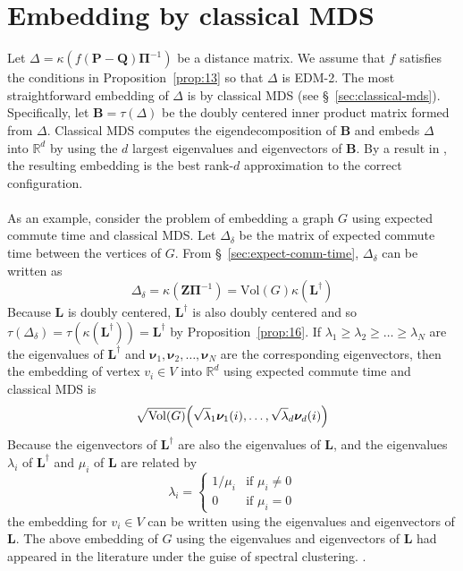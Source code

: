 \section{Embedding by classical MDS}
\label{sec:embedd-class-mds}
Let $\Delta = \kappa(f(\mathbf{P} - \mathbf{Q})\bm{\Pi}^{-1})$ be a
distance matrix. We assume that $f$ satisfies the conditions in
Proposition~\ref{prop:13} so that $\Delta$ is EDM-2. The most
straightforward embedding of $\Delta$ is by classical MDS (see
\S~\ref{sec:classical-mds}). Specifically, let $\mathbf{B} =
\tau(\Delta)$ be the doubly centered inner product matrix formed from
$\Delta$. Classical MDS computes the eigendecomposition of
$\mathbf{B}$ and embeds $\Delta$ into $\mathbb{R}^{d}$ by using the
$d$ largest eigenvalues and eigenvectors of $\mathbf{B}$. By a result
in \cite{eckart36:_approx}, the resulting embedding is the
best rank-$d$ approximation to the correct configuration. \\ \\
\noindent
As an example, consider the problem of embedding a graph $G$ using
expected commute time and classical MDS. Let $\Delta_\delta$ be the
matrix of expected commute time between the vertices of $G$. From
\S~\ref{sec:expect-comm-time}, $\Delta_{\delta}$ can be written as
\begin{equation*}
  \Delta_{\delta} = \kappa(\mathbf{Z}\bm{\Pi}^{-1}) = \mathrm{Vol}(G)
  \kappa(\mathbf{L}^{\dagger})
\end{equation*}
Because $\mathbf{L}$ is doubly centered, $\mathbf{L}^{\dagger}$ is
also doubly centered and so $\tau(\Delta_{\delta}) =
\tau(\kappa(\mathbf{L}^{\dagger})) = \mathbf{L}^{\dagger}$ by
Proposition~\ref{prop:16}. If $\lambda_1 \geq \lambda_2 \geq \dots \geq
\lambda_N$ are the eigenvalues of $\mathbf{L}^{\dagger}$ and
$\bm{\nu}_1, \bm{\nu}_2, \dots, \bm{\nu}_N$ are the corresponding
eigenvectors, then the embedding of vertex $v_i \in V$ into
$\mathbb{R}^{d}$ using expected commute time and classical MDS is
\begin{equation}
  \label{eq:33}
  \sqrt{\mathrm{Vol}(G)} 
\Bigl(\sqrt{\lambda}_1 \bm{\nu}_1(i), \dots, \sqrt{\lambda}_d \bm{\nu}_d(i) \Bigr)
\end{equation}
Because the eigenvectors of $\mathbf{L}^{\dagger}$ are also the
eigenvalues of $\mathbf{L}$, and the eigenvalues $\lambda_i$ of  
$\mathbf{L}^{\dagger}$ and $\mu_i$ of $\mathbf{L}$ are related by
\begin{equation}
  \label{eq:53}
  \lambda_i = \begin{cases}
    1/\mu_i & \text{if $\mu_i \not = 0$} \\
    0 & \text{if $\mu_i = 0$}
    \end{cases}
\end{equation}
the embedding for $v_i \in V$ can be written using the eigenvalues and
eigenvectors of $\mathbf{L}$. The above embedding of $G$ using the
eigenvalues and eigenvectors of $\mathbf{L}$ had appeared in the
literature under the guise of spectral clustering.
\citep{yen07:_graph,luxburg07:_tutor_spect_clust}.
